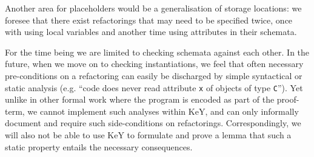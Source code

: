 Another area for placeholders would be a generalisation of storage locations:
we foresee that there exist refactorings that may need to be specified twice, once with using local variables and another time using attributes in their schemata.

For the time being we are limited to checking schemata against each other.
In the future, when we move on to checking instantiations, 
we feel that often necessary pre-conditions on a refactoring can easily be discharged by simple syntactical or static analysis (e.g. ``code does never read attribute \lstinline|x| of objects of type \lstinline|C|'').
Yet unlike in other formal work where the program is encoded as part of the proof-term, we cannot implement such analyses within KeY, and can only informally document and require such side-conditions on refactorings.
Correspondingly, we will also not be able to use KeY to formulate and prove a lemma that such a static property entails the necessary consequences.


